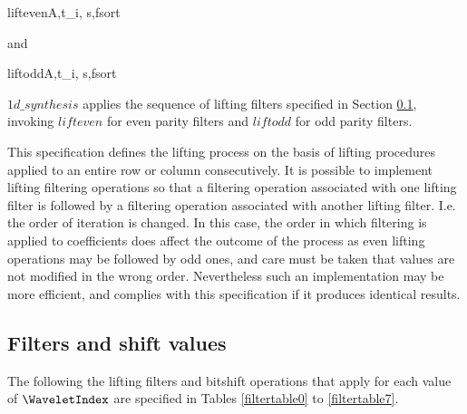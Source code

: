 \begin{pseudo}{lifteven}{A,t_i, s,fsort}
    \bsEND
    \bsELSE
\bsEND
\end{pseudo}

and

\begin{pseudo}{liftodd}{A,t_i, s,fsort}
    \bsEND
    \bsELSE
\bsEND\end{pseudo}

$1d\_synthesis$ applies the sequence of lifting filters specified in Section \ref{wltfilters},
invoking $lifteven$ for even parity filters and $liftodd$ for odd parity filters.

\begin{informative}
This specification defines the lifting process on the basis of lifting
procedures applied to an entire row or column consecutively. It is
possible to implement lifting filtering operations so that a filtering
operation associated with one lifting filter is followed by a filtering
operation associated with another lifting filter. I.e. the order of
iteration is changed. In this case, the order in which filtering is
applied to coefficients does affect the outcome of the process as even
lifting operations may be followed by odd ones, and care must be taken
that values are not modified in the wrong order. Nevertheless such an
implementation may be more efficient, and complies with this
specification if it produces identical results.
\end{informative}

\subsection{Filters and shift values}
\label{wltfilters}

The following the lifting filters and bitshift operations that
apply for each value of $\WaveletIndex$ are specified in Tables \ref{filtertable0} to
\ref{filtertable7}.


